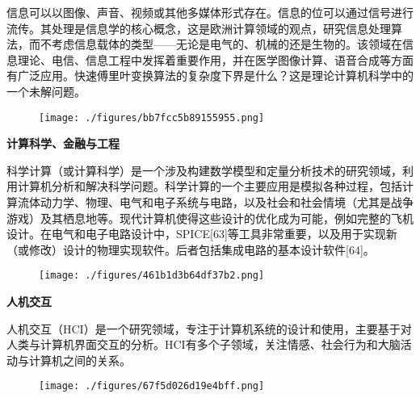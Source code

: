 信息可以以图像、声音、视频或其他多媒体形式存在。信息的位可以通过信号进行流传。其处理是信息学的核心概念，这是欧洲计算领域的观点，研究信息处理算法，而不考虑信息载体的类型——无论是电气的、机械的还是生物的。该领域在信息理论、电信、信息工程中发挥着重要作用，并在医学图像计算、语音合成等方面有广泛应用。快速傅里叶变换算法的复杂度下界是什么？这是理论计算机科学中的一个未解问题。
\begin{figure}[ht]
\centering
\texttt{[image: ./figures/bb7fcc5b89155955.png]}
\caption{} \label{fig_JSS_9}
\end{figure}
\textbf{计算科学、金融与工程}  

科学计算（或计算科学）是一个涉及构建数学模型和定量分析技术的研究领域，利用计算机分析和解决科学问题。科学计算的一个主要应用是模拟各种过程，包括计算流体动力学、物理、电气和电子系统与电路，以及社会和社会情境（尤其是战争游戏）及其栖息地等。现代计算机使得这些设计的优化成为可能，例如完整的飞机设计。在电气和电子电路设计中，SPICE[63]等工具非常重要，以及用于实现新（或修改）设计的物理实现软件。后者包括集成电路的基本设计软件[64]。
\begin{figure}[ht]
\centering
\texttt{[image: ./figures/461b1d3b64df37b2.png]}
\caption{} \label{fig_JSS_10}
\end{figure}
\textbf{人机交互} 

人机交互（HCI）是一个研究领域，专注于计算机系统的设计和使用，主要基于对人类与计算机界面交互的分析。HCI有多个子领域，关注情感、社会行为和大脑活动与计算机之间的关系。
\begin{figure}[ht]
\centering
\texttt{[image: ./figures/67f5d026d19e4bff.png]}
\caption{} \label{fig_JSS_11}
\end{figure}